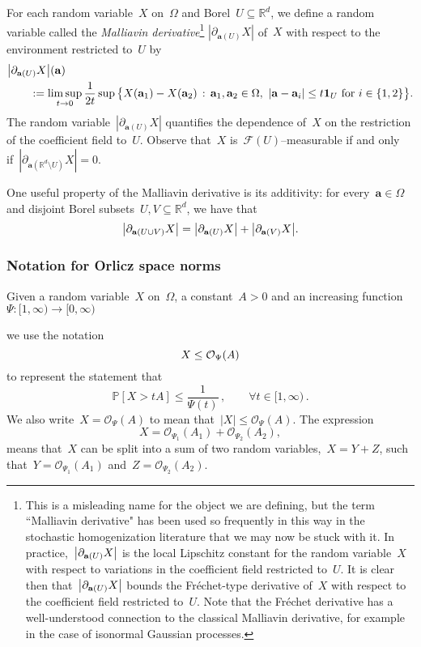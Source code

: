 \documentclass[11pt,twoside]{article} %
\numberwithin{equation}{section}
\theoremstyle{definition}
\let\originalleft\left
\let\originalright\right
\renewcommand{\left}{\mathopen{}\mathclose\bgroup\originalleft}
\renewcommand{\right}{\aftergroup\egroup\originalright}
\newcommand*{\Rd}{\ensuremath{\mathbb{R}^d}}
\renewcommand{\a}{\mathbf{a}}
\newcommand{\F}{\mathcal{F}}
\renewcommand{\P}{\mathbb{P}}
\renewcommand{\O}{\mathcal{O}}
\newcommand{\indc}{\boldsymbol{1}}
\begin{document}
For each random variable~$X$ on~$\Omega$ and Borel~$U\subseteq\Rd$, we define a random variable called the \emph{Malliavin derivative}\footnote{This is a misleading name for the object we are defining, but the term ``Malliavin derivative" has been used so frequently in this way in the stochastic homogenization literature that we may now be stuck with it. In practice,~$\left| \partial_{\a(U)} X \right|$ is the local Lipschitz constant for the random variable~$X$ with respect to variations in the coefficient field restricted to~$U$. It is clear then that~$\left| \partial_{\a(U)} X \right|$ bounds the Fr\'echet-type derivative of~$X$ with respect to the coefficient field restricted to~$U$. Note that the Fr\'echet derivative has a well-understood connection to the classical Malliavin derivative, for example in the case of isonormal Gaussian processes.}  
$|\partial_{\a(U)} X|$ of~$X$ with respect to the environment restricted to~$U$ by 
\begin{align} 
\label{e.Mall}
\lefteqn{
\left| \partial_{\a(U)} X\right| (\a) 
} \qquad & 
\notag \\ & 
:=
\limsup_{t\to 0} 
\frac1{2t} 
\sup \,
\bigl\{ X(\a_1) - X(\a_2) 
\,:\,
\a_1,\a_2 \in\Omega, \ \left| \a - \a_i \right| \leq t \indc_{U} \ \mbox{for} \ i\in\{1,2\}
\bigr\}.
\end{align}
The random variable~$|\partial_{\a(U)}X|$ quantifies the dependence of~$X$ on the restriction of the coefficient field to~$U$. Observe that~$X$ is~$\F(U)$--measurable if and only if~$|\partial_{\a(\Rd\setminus U)} X| = 0$. 

\smallskip

One useful property of the Malliavin derivative is its additivity: for every~$\a\in\Omega$ and disjoint Borel subsets~$U,V\subseteq \Rd$, we have that 
\begin{equation}
\label{e.malliavin.additivity}
\left| \partial_{\a(U\cup V)} X \right| 
= 
\left| \partial_{\a(U)} X \right| 
+
\left| \partial_{\a(V)} X  \right|.
\end{equation}




\subsubsection{Notation for Orlicz space norms}
Given a random variable~$X$ on~$\Omega$, a constant~$A>0$ and an increasing function~$\Psi:[1,\infty) \to [0,\infty)$ 

we use the notation 
\begin{equation}
X \leq \O_\Psi \left( A \right)
\end{equation}
to represent the statement that
\begin{equation}
\label{e.weakcondOPsi}
\P[ X > tA  ] \leq \frac1{\Psi(t)}\,, 
\qquad \forall t \in [1,\infty)
\, . 
\end{equation}
We also write~$X = \O_\Psi(A)$ to mean that~$|X| \leq \O_\Psi(A)$. The expression
\begin{equation*}
X = \O_{\Psi_1}(A_1) + \O_{\Psi_2}(A_2), 
\end{equation*}
means that~$X$ can be split into a sum of two random variables,~$X=Y+Z$, such that~$Y=\O_{\Psi_1}(A_1)$ and~$Z = \O_{\Psi_2}(A_2)$. 
\end{document}
